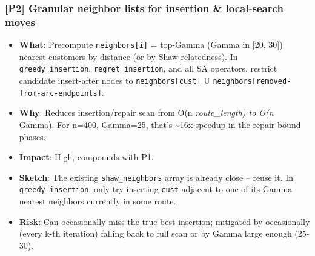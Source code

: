 \documentclass[twocolumn,10pt,letterpaper]{article}
\begin{document}
\subsubsection{[P2] Granular neighbor lists for insertion \& local-search moves}
\begin{itemize}
\setlength{\itemsep}{0pt}
\setlength{\parskip}{0pt}
  \item \textbf{What}: Precompute \texttt{neighbors[i]} = top-Gamma (Gamma in [20, 30]) nearest customers by distance (or by Shaw relatedness). In \texttt{greedy\_insertion}, \texttt{regret\_insertion}, and all SA operators, restrict candidate insert-after nodes to \texttt{neighbors[cust]} U \texttt{neighbors[removed-\allowbreak from-\allowbreak arc-\allowbreak endpoints]}.
  \item \textbf{Why}: Reduces insertion/repair scan from O(n \textit{ route\_length) to O(n } Gamma). For n=400, Gamma=25, that's \textasciitilde{}16x speedup in the repair-bound phases.
  \item \textbf{Impact}: High, compounds with P1.
  \item \textbf{Sketch}: The existing \texttt{shaw\_neighbors} array is already close -- reuse it. In \texttt{greedy\_insertion}, only try inserting \texttt{cust} adjacent to one of its Gamma nearest neighbors currently in some route.
  \item \textbf{Risk}: Can occasionally miss the true best insertion; mitigated by occasionally (every k-th iteration) falling back to full scan or by Gamma large enough (25-30).
\end{itemize}
\end{document}
